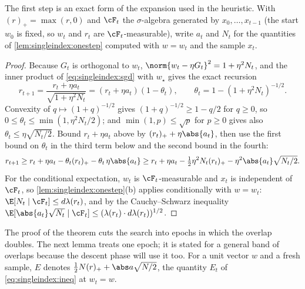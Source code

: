 \begin{refsection}
The first step is an exact form of the expansion used in the heuristic. With $(r)_+=\max(r,0)$ and $\cF_t$ the $\sigma$-algebra generated by $x_0,\dots,x_{t-1}$ (the start $w_0$ is fixed, so $w_t$ and $r_t$ are $\cF_t$-measurable), write $a_t$ and $N_t$ for the quantities of \cref{lem:singleindex:onestep} computed with $w=w_t$ and the sample $x_t$.


\begin{proof}
Because $G_t$ is orthogonal to $w_t$, $\norm{w_t-\eta G_t}^2=1+\eta^2N_t$, and the inner product of \eqref{eq:singleindex:sgd} with $w_\star$ gives the exact recursion
\[
  r_{t+1}=\frac{r_t+\eta a_t}{\sqrt{1+\eta^2N_t}}=(r_t+\eta a_t)(1-\theta_t),\qquad\theta_t=1-(1+\eta^2N_t)^{-1/2}.
\]
Convexity of $q\mapsto(1+q)^{-1/2}$ gives $(1+q)^{-1/2}\ge1-q/2$ for $q\ge0$, so $0\le\theta_t\le\min(1,\eta^2N_t/2)$; and $\min(1,p)\le\sqrt p$ for $p\ge0$ gives also $\theta_t\le\eta\sqrt{N_t/2}$. Bound $r_t+\eta a_t$ above by $(r_t)_++\eta\abs{a_t}$, then use the first bound on $\theta_t$ in the third term below and the second bound in the fourth:
\[
  r_{t+1}\ge r_t+\eta a_t-\theta_t(r_t)_+-\theta_t\,\eta\abs{a_t}\ge r_t+\eta a_t-\tfrac12\eta^2N_t(r_t)_+-\eta^2\abs{a_t}\sqrt{N_t/2} .
\]
For the conditional expectation, $w_t$ is $\cF_t$-measurable and $x_t$ is independent of $\cF_t$, so \cref{lem:singleindex:onestep}(b) applies conditionally with $w=w_t$: $\E[N_t\mid\cF_t]\le d\lambda(r_t)$, and by the Cauchy--Schwarz inequality $\E[\abs{a_t}\sqrt{N_t}\mid\cF_t]\le(\lambda(r_t)\cdot d\lambda(r_t))^{1/2}$.
\end{proof}

The proof of the theorem cuts the search into epochs in which the overlap doubles. The next lemma treats one epoch; it is stated for a general band of overlaps because the descent phase will use it too. For a unit vector $w$ and a fresh sample, $E$ denotes $\frac12N(r)_++\abs a\sqrt{N/2}$, the quantity $E_t$ of \eqref{eq:singleindex:ineq} at $w_t=w$.


\end{refsection}

